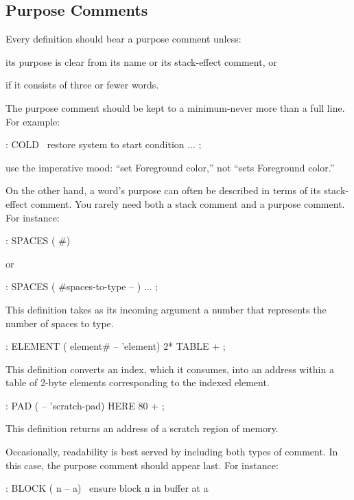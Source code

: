 \subsection{Purpose Comments}

\begin{tip}
Every definition should bear a purpose comment unless:
\begin{list}{.}{}
\item its purpose is clear from its name or its stack-effect comment, or
\item if it consists of three or fewer words.
\end{list}
\end{tip}
The purpose comment should be kept to a minimum-never more than a full
line.  For example:
\begin{Code}
: COLD   \ restore system to start condition
    ... ;
\end{Code}
use the imperative mood: ``set Foreground color,'' not ``sets
Foreground color.''

On the other hand, a word's purpose can often be described in terms of
its stack-effect comment.  You rarely need both a stack comment and a
purpose comment.  For instance:
\begin{Code}
: SPACES  ( #)
\end{Code}
or
\begin{Code}
: SPACES  ( #spaces-to-type -- )   ... ;
\end{Code}
This definition takes as its incoming argument a number that
represents the number of spaces to type.
\begin{Code}
: ELEMENT  ( element# -- 'element)  2*  TABLE + ;
\end{Code}
This definition converts an index, which it consumes, into an address
within a table of 2-byte elements corresponding to the indexed element.
\begin{Code}
: PAD  ( -- 'scratch-pad)  HERE  80 + ;
\end{Code}
This definition returns an address of a scratch region of memory.

Occasionally, readability is best served by including both types of
comment. In this case, the purpose comment should appear last.  For
instance:
\begin{Code}
: BLOCK  ( n -- a)  \   ensure block n in buffer at a
\end{Code}

